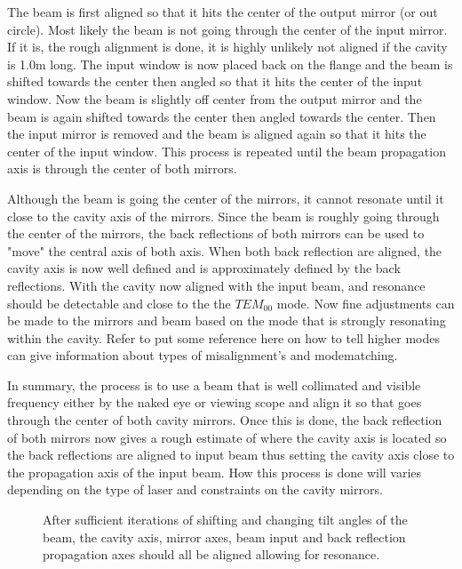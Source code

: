 \documentclass[11pt,a4paper]{book}
\newcommand{\imginput}[1]{} %
\begin{document}
		The beam is first aligned so that it hits the center of the output mirror (or out circle). Most likely the beam is not going through the center of the input mirror. If it is, the rough alignment is done, it is highly unlikely not aligned if the cavity is 1.0m long. The input window is now placed back on the flange and the beam is shifted towards the center then angled so that it hits the center of the input window. Now the beam is slightly off center from the output mirror and the beam is again shifted towards the center then angled towards the center. Then the input mirror is removed and the beam is aligned again so that it hits the center of the input window. This process is repeated until the beam propagation axis is through the center of both mirrors. 
		
		Although the beam is going the center of the mirrors, it cannot resonate until it close to the cavity axis of the mirrors. Since the beam is roughly going through the center of the mirrors, the back reflections of both mirrors can be used to "move" the central axis of both axis. When both back reflection are aligned, the cavity axis is now well defined and is approximately defined by the back reflections. With the cavity now aligned with the input beam, and resonance should be detectable and close to the the $TEM_{00}$ mode. Now fine adjustments can be made to the mirrors and beam based on the mode that is strongly resonating within the cavity. Refer to put some reference here on how to tell higher modes can give information about types of misalignment's and modematching.
		
		In summary, the process is to use a beam that is well collimated and visible frequency either by the naked eye or viewing scope and align it so that goes through the center of both cavity mirrors. Once this is done, the back reflection of both mirrors now gives a rough estimate of where the cavity axis is located so the back reflections are aligned to input beam thus setting the cavity axis close to the propagation axis of the input beam. How this process is done will varies depending on the type of laser and constraints on the cavity mirrors.
		
		\begin{figure} [!ht]
			\centering
			\def\svgwidth{\columnwidth}
			\resizebox{130mm}{!}{\imginput{images/cav-align-proper.pdf_tex}}
			\caption{After sufficient iterations of shifting and changing tilt angles of the beam, the cavity axis, mirror axes, beam input and back reflection propagation axes should all be aligned allowing for resonance. }
			\label{fig:cav-align-proper}
		\end{figure}
\end{document}
